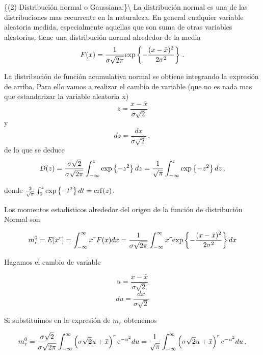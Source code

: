 \documentclass[
]{agujournal2019}
\begin{document}
\vspace{0.5cm}

\{\noindent  (2) Distribución normal o Gaussiana:\}\textbackslash{} La
distribución normal es una de las distribuciones mas recurrente en la
naturaleza. En general cualquier variable aleatoria medida,
especialmente aquellas que son suma de otras variables aleatorias, tiene
una distribución normal alrededor de la media
\[F(x)=\frac{1}{\sigma\sqrt{2\pi}}{\rm exp}
   \left\{ -\frac{(x-\bar{x})^2}{2\sigma^2} \right\}\,.\]

\begin{center}
\end{center}

La distribución de función acumulativa normal se obtiene integrando la
expresión de arriba. Para ello vamos a realizar el cambio de variable
(que no es nada mas que estandarizar la variable aleatoria x)
\[z=\frac{x-\bar{x}}{\sigma\sqrt{2}}\] y
\[dz=\frac{dx}{\sigma\sqrt{2}}\,,\] de lo que se deduce
\[D(z)=\frac{\sigma\sqrt{2}}{\sigma\sqrt{2\pi}}\int^z_{-\infty} {\rm exp}
  \left\{ -z^2 \right\}dz =
  \frac{1}{\sqrt{\pi}}\int^z_{-\infty} {\rm exp}
  \left\{ -z^2 \right\} dz\,,\]

donde
\(\frac{2}{\sqrt{\pi}}\int^z_{0}{\rm exp}\left\{ -t^2 \right\}dt={\rm erf}(z)\,.\)

\begin{center}
\end{center}

Los momentos estadísticos alrededor del origen de la función de
distribución Normal son

\[m^0_r=E[x^r]=\int^{\infty}_{-\infty} x^rF(x)dx=\frac{1}{\sigma\sqrt{2\pi}}\int^{\infty}_{-\infty}x^r{\rm exp}
   \left\{ -\frac{(x-\bar{x})^2}{2\sigma^2} \right\} dx\]

Hagamos el cambio de variable

\[u=\frac{x-\bar{x}}{\sigma\sqrt{2}}\] \[du=\frac{dx}{\sigma\sqrt{2}}\]

Si substituimos en la expresión de \(m_r\) obtenemos

\[m^0_r=\frac{\sigma\sqrt{2}}{\sigma\sqrt{2\pi}}\int^{\infty}_{-\infty}
  \left( \sigma \sqrt{2}u+\bar{x}\right)^r{\rm e}^{-u^2}du=
  \frac{1}{\sqrt{\pi}}\int^{\infty}_{-\infty}\left( \sigma \sqrt{2}u+\bar{x}\right)^r{\rm e}
   ^{-u^2}du\,.\]

\vspace{0.25cm}
\end{document}
